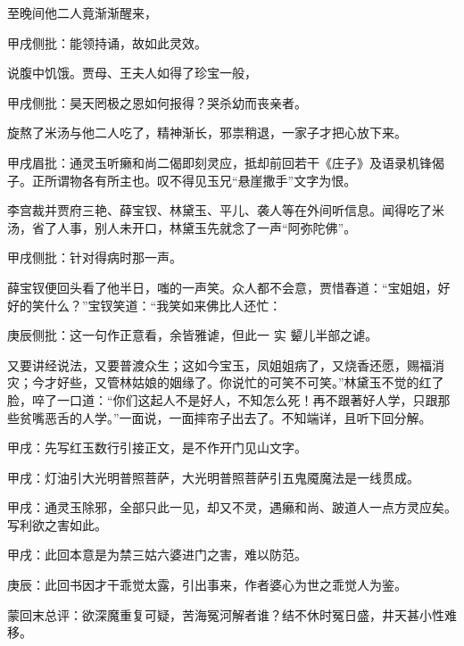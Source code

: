 \begin{parag}
    至晚间他二人竟渐渐醒来，\begin{note}甲戌侧批：能领持诵，故如此灵效。\end{note}说腹中饥饿。贾母、王夫人如得了珍宝一般，\begin{note}甲戌侧批：昊天罔极之恩如何报得？哭杀幼而丧亲者。\end{note}旋熬了米汤与他二人吃了，精神渐长，邪祟稍退，一家子才把心放下来。\begin{note}甲戌眉批：通灵玉听癞和尚二偈即刻灵应，抵却前回若干《庄子》及语录机锋偈子。正所谓物各有所主也。叹不得见玉兄“悬崖撒手”文字为恨。\end{note}李宫裁并贾府三艳、薛宝钗、林黛玉、平儿、袭人等在外间听信息。闻得吃了米汤，省了人事，别人未开口，林黛玉先就念了一声“阿弥陀佛”。\begin{note}甲戌侧批：针对得病时那一声。\end{note}薛宝钗便回头看了他半日，嗤的一声笑。众人都不会意，贾惜春道：“宝姐姐，好好的笑什么？”宝钗笑道：“我笑如来佛比人还忙：\begin{note}庚辰侧批：这一句作正意看，余皆雅谑，但此一 实 颦儿半部之谑。\end{note}又要讲经说法，又要普渡众生；这如今宝玉，凤姐姐病了，又烧香还愿，赐福消灾；今才好些，又管林姑娘的姻缘了。你说忙的可笑不可笑。”林黛玉不觉的红了脸，啐了一口道：“你们这起人不是好人，不知怎么死！再不跟著好人学，只跟那些贫嘴恶舌的人学。”一面说，一面摔帘子出去了。不知端详，且听下回分解。
\end{parag}


\begin{parag}
    \begin{note}甲戌：先写红玉数行引接正文，是不作开门见山文字。\end{note}
\end{parag}


\begin{parag}
    \begin{note}甲戌：灯油引大光明普照菩萨，大光明普照菩萨引五鬼魇魔法是一线贯成。\end{note}
\end{parag}


\begin{parag}
    \begin{note}甲戌：通灵玉除邪，全部只此一见，却又不灵，遇癞和尚、跛道人一点方灵应矣。写利欲之害如此。\end{note}
\end{parag}


\begin{parag}
    \begin{note}甲戌：此回本意是为禁三姑六婆进门之害，难以防范。\end{note}
\end{parag}


\begin{parag}
    \begin{note}庚辰：此回书因才干乖觉太露，引出事来，作者婆心为世之乖觉人为鉴。\end{note}
\end{parag}


\begin{parag}
    \begin{note}蒙回末总评：欲深魔重复可疑，苦海冤河解者谁？结不休时冤日盛，井天甚小性难移。\end{note}
\end{parag}

